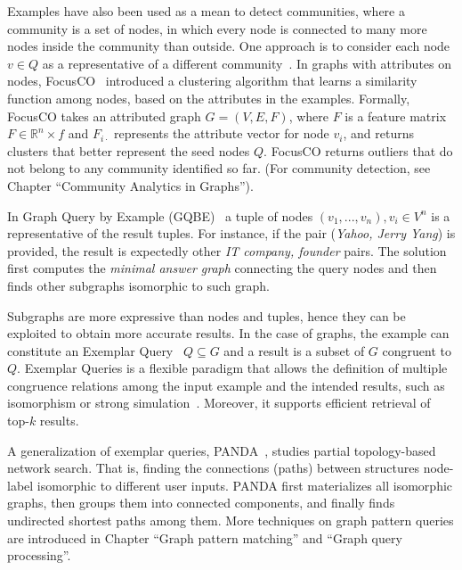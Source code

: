 Examples have also been used as a mean to detect communities, 
where a community is a set of nodes, in which every node is connected to many more nodes inside the community than outside. 
One approach is to consider each node $v \in Q$ as a representative of a different community~\citep{staudt2014detecting}. 
In graphs with attributes on nodes, FocusCO~\citep{perozzi2014focused} introduced a clustering algorithm that learns a similarity function among nodes, based on the attributes in the examples.
Formally, FocusCO takes an attributed graph $G = (V,E,F)$, where $F$ is a feature matrix $F \in \mathbb{R}^n\times f$ and $F_{i\cdot}$ represents the attribute vector for node $v_i$, and returns clusters that better represent the seed nodes $Q$.
FocusCO returns outliers that do not belong to any community identified so far. 
(For community detection, see Chapter ``Community Analytics in Graphs'').  



In Graph Query by Example (GQBE)~\citep{jayaram2015querying} a tuple of nodes $(v_1, ..., v_n), v_i \in V^n$ is a representative of the result tuples. 
For instance, if the pair (\emph{Yahoo, Jerry Yang}) is provided, the result is expectedly other \emph{IT company, founder} pairs. 
The solution first computes the \emph{minimal answer graph} connecting the query nodes and then finds other subgraphs isomorphic to such graph. 

Subgraphs are more expressive than nodes and tuples, hence they can be exploited to obtain more accurate results. 
In the case of graphs, the example can constitute an Exemplar Query~\citep{mottin2016exemplar} $Q\subseteq G$ and a result is a subset of $G$ congruent to $Q$.
Exemplar Queries is a flexible paradigm that allows the definition of multiple congruence relations among the input example and the intended results, such as isomorphism or strong simulation~\citep{ma2014strong}. 
Moreover, it supports efficient retrieval of top-$k$ results. 

A generalization of exemplar queries, PANDA~\citep{xie2017panda}, studies partial topology-based network search. 
That is, finding the connections (paths) between structures node-label isomorphic to different user inputs. 
PANDA first materializes all isomorphic graphs, then groups them into connected components, and finally finds undirected shortest paths among them. 
More techniques on graph pattern queries are introduced 
in Chapter ``Graph pattern matching'' and 
``Graph query processing''.



